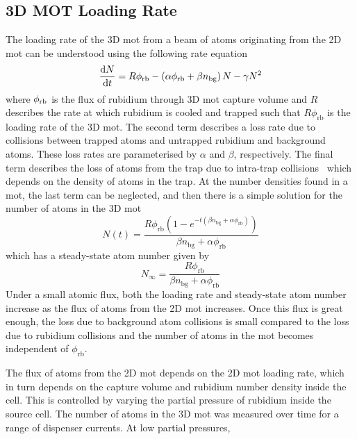 \subsection{3D MOT Loading Rate}\label{subsec:loading_rate}
The loading rate of the 3D \ac{mot} from a beam of atoms originating from the 2D
\ac{mot} can be understood using the following rate equation
\begin{equation}
	\frac{\mathrm{d} N}{\mathrm{d}t} = R  \phi_\textnormal{rb} - \left(\alpha \phi_\textnormal{rb}  + \beta n_\textnormal{bg} \right) N - \gamma N^2
	\label{eq:loading_rate}
\end{equation}
where \(\phi_\textnormal{rb}\) is the flux of rubidium through 3D \ac{mot}
capture volume and \(R\) describes the rate at which rubidium is cooled and
trapped such that \( R \phi_\text{rb}\) is the loading rate of the 3D \ac{mot}.
The second term describes a loss rate due to collisions between trapped atoms
and untrapped rubidium and background atoms. These loss rates are parameterised
by \(\alpha\) and \(\beta\), respectively. The final term describes the loss of
atoms from the trap due to intra-trap collisions~\cite{Prentiss1988} which
depends on the density of atoms in the trap. 
At the number densities found in a \ac{mot}, the last term can be
neglected, and then there is a simple
solution for the number of atoms in the 3D \ac{mot}
\begin{equation}
	N(t) = \frac{R \phi _{\text{rb}} \left(1-e^{-t \left(\beta  n_{\text{bg}}+\alpha  \phi _{\text{rb}}\right)}\right)}{\beta  n_{\text{bg}}+\alpha  \phi _{\text{rb}}}
	\label{eq:atom_number}
\end{equation}
which has a steady-state atom number given by
\begin{equation}
	N_\infty = \frac{R \phi _{\text{rb}}}{\beta  n_{\text{bg}}+\alpha  \phi _{\text{rb}}}
\end{equation}
Under a small atomic flux, both the loading rate and steady-state atom number
increase as the flux of atoms from the 2D \ac{mot} increases. Once this flux is
great enough, the loss due to background atom collisions is small compared to
the loss due to rubidium collisions and the number of atoms in the
\ac{mot} becomes independent of
\(\phi_\text{rb}\). \par\noindent The flux of atoms from the 2D \ac{mot} depends on the 2D
\ac{mot} loading rate, which in turn depends on the capture volume and rubidium
number density inside the cell. This is controlled by
varying the partial pressure of rubidium inside the source cell. The number of atoms in the 3D \ac{mot} was measured over time for a range of dispenser currents. At low partial pressures,
